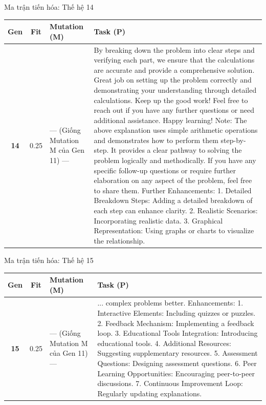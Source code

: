 \documentclass[english,main=vietnamese,xcolor=table]{beamer}
\begin{document}
\begin{frame}{Ma trận tiến hóa: Thế hệ 14}
\tiny
\centering
\renewcommand{\arraystretch}{1.4}
\begin{tabular}{|c|c|p{4.7cm}|p{5.1cm}|}
\hline
\rowcolor{blue!20} \textbf{Gen} & \textbf{Fit} & \textbf{Mutation (M)} & \textbf{Task (P)} \\ \hline
\textbf{14} & 0.25 & --- (Giống Mutation M của Gen 11) --- & By breaking down the problem into clear steps and verifying each part, we ensure that the calculations are accurate and provide a comprehensive solution. Great job on setting up the problem correctly and demonstrating your understanding through detailed calculations. Keep up the good work! Feel free to reach out if you have any further questions or need additional assistance. Happy learning! Note: The above explanation uses simple arithmetic operations and demonstrates how to perform them step-by-step. It provides a clear pathway to solving the problem logically and methodically. If you have any specific follow-up questions or require further elaboration on any aspect of the problem, feel free to share them. Further Enhancements: 1. Detailed Breakdown Steps: Adding a detailed breakdown of each step can enhance clarity. 2. Realistic Scenarios: Incorporating realistic data. 3. Graphical Representation: Using graphs or charts to visualize the relationship. \\ \hline
\end{tabular}
\end{frame}

\begin{frame}{Ma trận tiến hóa: Thế hệ 15}
\tiny
\centering
\renewcommand{\arraystretch}{1.4}
\begin{tabular}{|c|c|p{4.7cm}|p{5.1cm}|}
\hline
\rowcolor{blue!20} \textbf{Gen} & \textbf{Fit} & \textbf{Mutation (M)} & \textbf{Task (P)} \\ \hline
\textbf{15} & 0.25 & --- (Giống Mutation M của Gen 11) --- & ... complex problems better. Enhancements: 1. Interactive Elements: Including quizzes or puzzles. 2. Feedback Mechanism: Implementing a feedback loop. 3. Educational Tools Integration: Introducing educational tools. 4. Additional Resources: Suggesting supplementary resources. 5. Assessment Questions: Designing assessment questions. 6. Peer Learning Opportunities: Encouraging peer-to-peer discussions. 7. Continuous Improvement Loop: Regularly updating explanations. \\ \hline
\end{tabular}
\end{frame}
\end{document}
